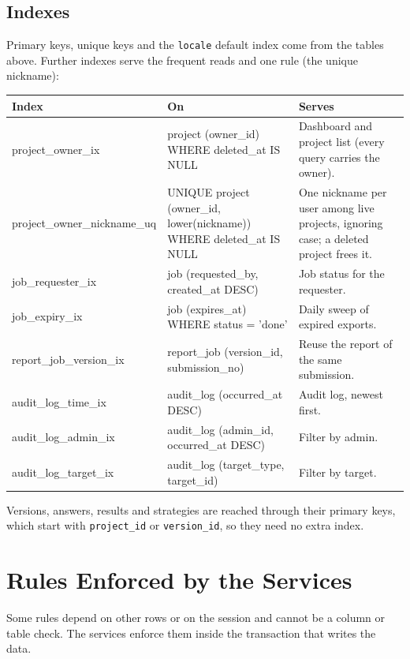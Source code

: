 \documentclass[11pt,a4paper]{article}
\newcommand{\tb}[1]{\texttt{#1}}
\begin{document}
\subsection{Indexes}
Primary keys, unique keys and the \tb{locale} default index come from the tables above. Further indexes serve the frequent reads and one rule (the unique nickname):

{\footnotesize\noindent
\begin{tabularx}{\linewidth}{@{}>{\ttfamily}l >{\ttfamily\raggedright\arraybackslash}p{6.2cm} Y@{}}
\toprule{}\normalfont Index & \normalfont On & Serves \\ \midrule
project\_owner\_ix & project (owner\_id) WHERE deleted\_at IS NULL & Dashboard and project list (every query carries the owner). \\
project\_owner\_nickname\_uq & UNIQUE project (owner\_id, lower(nickname)) WHERE deleted\_at IS NULL & One nickname per user among live projects, ignoring case; a deleted project frees it. \\
job\_requester\_ix & job (requested\_by, created\_at DESC) & Job status for the requester. \\
job\_expiry\_ix & job (expires\_at) WHERE status = 'done' & Daily sweep of expired exports. \\
report\_job\_version\_ix & report\_job (version\_id, submission\_no) & Reuse the report of the same submission. \\
audit\_log\_time\_ix & audit\_log (occurred\_at DESC) & Audit log, newest first. \\
audit\_log\_admin\_ix & audit\_log (admin\_id, occurred\_at DESC) & Filter by admin. \\
audit\_log\_target\_ix & audit\_log (target\_type, target\_id) & Filter by target. \\
\bottomrule
\end{tabularx}}

\noindent Versions, answers, results and strategies are reached through their primary keys, which start with \tb{project\_id} or \tb{version\_id}, so they need no extra index.

\needspace{0.5\textheight}\section{Rules Enforced by the Services}
Some rules depend on other rows or on the session and cannot be a column or table check. The services enforce them inside the transaction that writes the data.
\end{document}
